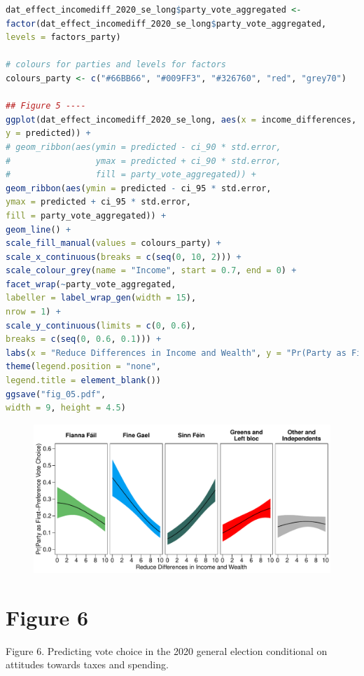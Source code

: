 \documentclass[12pt,letterpaper]{article}
\begin{document}
\begin{lstlisting}[language=R]
dat_effect_incomediff_2020_se_long$party_vote_aggregated <- 
factor(dat_effect_incomediff_2020_se_long$party_vote_aggregated,
levels = factors_party)

# colours for parties and levels for factors
colours_party <- c("#66BB66", "#009FF3", "#326760", "red", "grey70")

## Figure 5 ----
ggplot(dat_effect_incomediff_2020_se_long, aes(x = income_differences, 
y = predicted)) +
# geom_ribbon(aes(ymin = predicted - ci_90 * std.error,
#                 ymax = predicted + ci_90 * std.error,
#                 fill = party_vote_aggregated)) +
geom_ribbon(aes(ymin = predicted - ci_95 * std.error,
ymax = predicted + ci_95 * std.error,
fill = party_vote_aggregated)) +
geom_line() +
scale_fill_manual(values = colours_party) +
scale_x_continuous(breaks = c(seq(0, 10, 2))) +
scale_colour_grey(name = "Income", start = 0.7, end = 0) +
facet_wrap(~party_vote_aggregated,
labeller = label_wrap_gen(width = 15),
nrow = 1) +
scale_y_continuous(limits = c(0, 0.6),
breaks = c(seq(0, 0.6, 0.1))) +  
labs(x = "Reduce Differences in Income and Wealth", y = "Pr(Party as First-Preference Vote Choice)") +
theme(legend.position = "none", 
legend.title = element_blank())
ggsave("fig_05.pdf",
width = 9, height = 4.5)
\end{lstlisting}

\begin{figure}
	\centering
	\includegraphics[width=0.8\linewidth]{fig_05}
\end{figure}

\newpage
\section*{Figure 6} 
\vspace{.25cm}

Figure 6. Predicting vote choice in the 2020 general election conditional on attitudes
towards taxes and spending.
\end{document}
